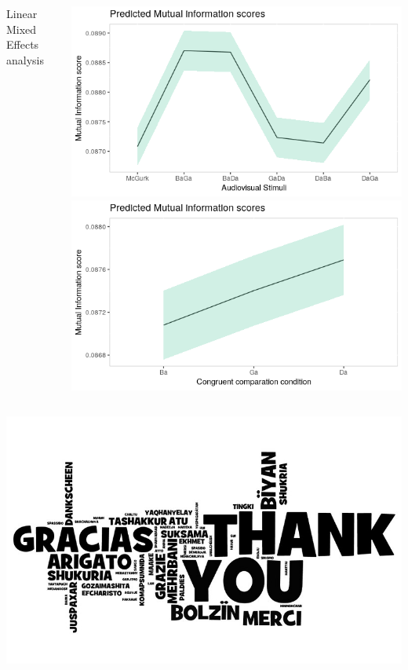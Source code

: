 \documentclass{beamer}
\begin{document}
\begin{frame}
\begin{columns}
\begin{center}
\begin{tiny}
Linear Mixed Effects analysis
\end{tiny}
\end{center}
\includegraphics[width=\textwidth]{images/input}
\includegraphics[width=\textwidth]{images/condition}
\end{columns}
\end{frame}



\begin{frame}
\centering
\includegraphics[width=.8\textwidth]{images/thanks}
\end{frame}




\end{document}
